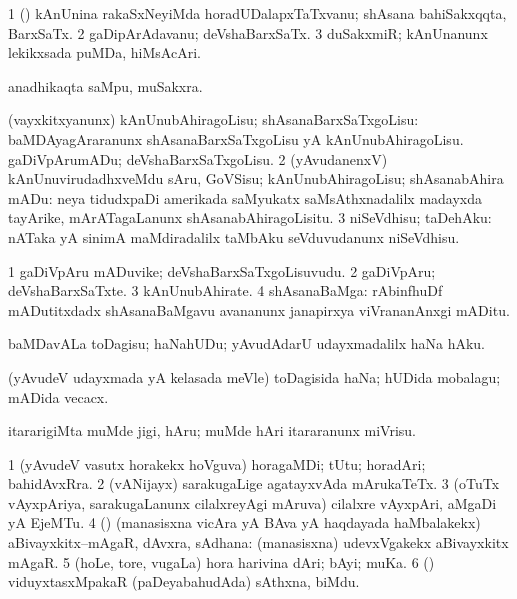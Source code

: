 \bentry
{}
\gl{\nA}
\bmng
\bnum
\num{1} (\ca) kAnUnina rakaSxNeyiMda horadUDalapxTaTxvanu; shAsana bahiSakxqqta, BarxSaTx. 
\num{2} gaDipArAdavanu; deVshaBarxSaTx. 
\num{3} duSakxmiR; kAnUnanunx lekikxsada puMDa, hiMsAcAri. 
\enum
\emng

\noindent
\gl{\pagu}
\bmng
{} anadhikaqta saMpu, muSakxra. 
\emng
\eentry

\bentry
{}
\gl{\sakirx}
\bmng
\bnum
{} (vayxkitxyanunx) 
\banum
{} kAnUnubAhiragoLisu; shAsanaBarxSaTxgoLisu:  baMDAyagAraranunx shAsanaBarxSaTxgoLisu yA kAnUnubAhiragoLisu. 
 gaDiVpArumADu; deVshaBarxSaTxgoLisu. 
\eanum
\numie
\num{2} (yAvudanenxV) kAnUnuvirudadhxveMdu sAru, GoVSisu; kAnUnubAhiragoLisu; shAsanabAhira mADu:  neya tidudxpaDi amerikada saMyukatx saMsAthxnadalilx madayxda tayArike, mArATagaLanunx shAsanabAhiragoLisitu. 
\num{3} niSeVdhisu; taDehAku:  nATaka yA sinimA maMdiradalilx taMbAku seVduvudanunx niSeVdhisu. 
\enum
\emng
\eentry

\bentry
{}
\gl{\nA}
\bmng
\bnum
\num{1} gaDiVpAru mADuvike; deVshaBarxSaTxgoLisuvudu. 
\num{2} gaDiVpAru; deVshaBarxSaTxte. 
\num{3} kAnUnubAhirate. 
\num{4} shAsanaBaMga:  rAbinfhuDf mADutitxdadx shAsanaBaMgavu avananunx janapirxya viVrananAnxgi mADitu. 
\enum
\emng
\eentry

\bentry
{}
\gl{\sakirx}
\bmng
baMDavALa toDagisu; haNahUDu; yAvudAdarU udayxmadalilx haNa hAku. 
\emng
\eentry

\bentry
{}
\gl{\nA}
\bmng
(yAvudeV udayxmada yA kelasada meVle) toDagisida haNa; hUDida mobalagu; mADida vecacx. 
\emng
\eentry

\bentry
{}
\gl{\sakirx}
\bmng
itararigiMta muMde jigi, hAru; muMde hAri itararanunx miVrisu. 
\emng
\eentry

\bentry
{}
\gl{\nA}
\bmng
\bnum
\num{1} (yAvudeV vasutx horakekx hoVguva) horagaMDi; tUtu; horadAri; bahidAvxRra. 
\num{2} (vANijayx) sarakugaLige agatayxvAda mArukaTeTx. 
\num{3} (oTuTx vAyxpAriya, sarakugaLanunx cilalxreyAgi mAruva) cilalxre vAyxpAri, aMgaDi yA EjeMTu. 
\num{4} (\rUpa) (manasisxna vicAra yA BAva yA haqdayada haMbalakekx) aBivayxkitx--mAgaR, dAvxra, sAdhana:  (manasisxna) udevxVgakekx aBivayxkitx mAgaR. 
\num{5} (hoLe, tore, \mo vugaLa) hora harivina dAri; bAyi; muKa. 
\num{6} (\ame) viduyxtasxMpakaR (paDeyabahudAda) sAthxna, biMdu. 
\enum
\emng
\eentry

